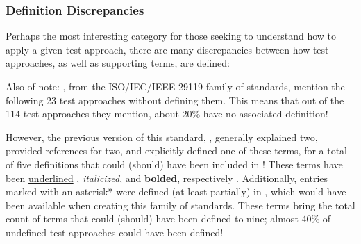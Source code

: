     \begin{bigLandscape}
        
    \end{bigLandscape}
\else %
\fi

\subsubsection{Definition Discrepancies}
\label{defs}

Perhaps the most interesting category for those seeking to understand how to
apply a given test approach, there are many discrepancies between how test
approaches, as well as supporting terms, are defined:



\ifnotpaper
    Also of note: \citep{IEEE2022, IEEE2021}, from the
    ISO/IEC/IEEE 29119 family of standards, mention the following 23 test
    approaches without defining them. This means that out of the 114 test
    approaches they mention, about 20\% have no associated definition!

    However, the previous version of this standard, \citeyearpar{IEEE2013},
    generally explained two, provided references for two, and explicitly defined
    one of these terms, for a total of five definitions that could (should) have
    been included in \citeyearpar{IEEE2022}! These terms have been
    \underline{underlined}\ifnotpaper%
        , \emph{italicized}, and \textbf{bolded}, respectively%
    \fi. Additionally, entries marked with an asterisk* were defined (at least
    partially) in \citeyearpar{IEEE2017}, which would have been available when
    creating this family of standards. These terms bring the total count of terms
    that could (should) have been defined to nine; almost 40\% of undefined test
    approaches could have been defined!

